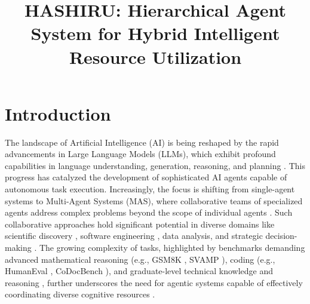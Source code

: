 \documentclass[conference]{IEEEtran}
\begin{document}
\title{HASHIRU: Hierarchical Agent System for Hybrid Intelligent Resource Utilization}

\author{
\and
{}
\and
{}
\and
{}
}

\maketitle

\section{Introduction}\label{sec:introduction}

The landscape of Artificial Intelligence (AI) is being reshaped by the rapid advancements in Large Language Models (LLMs), which exhibit profound capabilities in language understanding, generation, reasoning, and planning \cite{brown2020language, devlin2019bert, raffel2020exploring}. This progress has catalyzed the development of sophisticated AI agents capable of autonomous task execution. Increasingly, the focus is shifting from single-agent systems to Multi-Agent Systems (MAS), where collaborative teams of specialized agents address complex problems beyond the scope of individual agents \cite{dorri2018multi, wooldridge2009introduction}. Such collaborative approaches hold significant potential in diverse domains like scientific discovery \cite{boiko2023emergent}, software engineering \cite{qian2023communicative}, data analysis, and strategic decision-making \cite{wang2023decision}. The growing complexity of tasks, highlighted by benchmarks demanding advanced mathematical reasoning (e.g., GSM8K \cite{cobbe2021gsm8k}, SVAMP \cite{patel2021svamp}), coding (e.g., HumanEval \cite{chen2021codex}, CoDocBench \cite{pai2024codocbench}), and graduate-level technical knowledge and reasoning \cite{phan2025humanitysexam}, further underscores the need for agentic systems capable of effectively coordinating diverse cognitive resources \cite{wen2024benchmarkingcomplexinstructionfollowingmultiple}.
\end{document}
